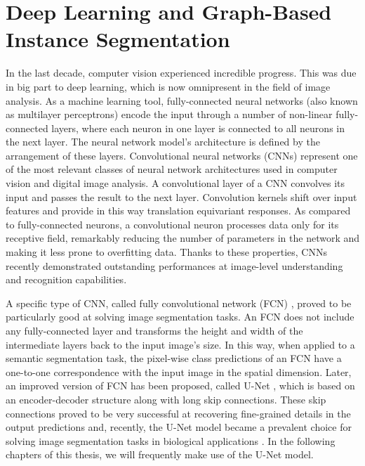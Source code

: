 \newpage
\section{Deep Learning and Graph-Based Instance Segmentation}
In the last decade, computer vision experienced incredible progress. This was due in big part to deep learning, which is now omnipresent in the field of image analysis. As a machine learning tool, fully-connected neural networks (also known as multilayer perceptrons) encode the input through a number of non-linear fully-connected layers, where each neuron in one layer is connected to all neurons in the next layer. The neural network model's architecture is defined by the arrangement of these layers. Convolutional neural networks (CNNs) represent one of the most relevant classes of neural network architectures used in computer vision and digital image analysis. A convolutional layer of a CNN convolves its input and passes the result to the next layer. Convolution kernels shift over input features and provide in this way translation equivariant responses. As compared to fully-connected neurons, a convolutional neuron processes data only for its receptive field, remarkably reducing the number of parameters in the network and making it less prone to overfitting data.
Thanks to these properties, CNNs recently demonstrated outstanding performances at image-level understanding and recognition capabilities.

A specific type of CNN, called fully convolutional network (FCN) \cite{long2015fully}, proved to be particularly good at solving image segmentation tasks. An FCN does not include any fully-connected layer and transforms the height and width of the intermediate layers back to the input image's size. 
In this way, when applied to a semantic segmentation task, the pixel-wise class predictions of an FCN have a one-to-one correspondence with the input image in the spatial dimension.
Later, an improved version of FCN has been proposed, called U-Net \cite{ronneberger2015u}, which is based on an encoder-decoder structure along with long skip connections. These skip connections proved to be very successful at recovering fine-grained details in the output predictions and, recently, the U-Net model became a prevalent choice for solving image segmentation tasks in biological applications \cite{lee2017superhuman,ronneberger2015u}. In the following chapters of this thesis, we will frequently make use of the U-Net model. 

